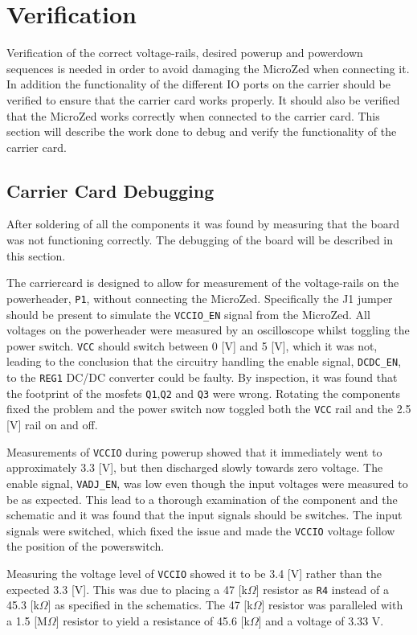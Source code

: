 \section{Verification}
Verification of the correct voltage-rails, desired powerup and powerdown sequences is needed in order to avoid damaging the MicroZed when connecting it.
In addition the functionality of the different IO ports on the carrier should be verified to ensure that the carrier card works properly.
It should also be verified that the MicroZed works correctly when connected to the carrier card.
This section will describe the work done to debug and verify the functionality of the carrier card.

\subsection{Carrier Card Debugging}
After soldering of all the components it was found by measuring that the board was not functioning correctly.
The debugging of the board will be described in this section.

The carriercard is designed to allow for measurement of the voltage-rails on the powerheader, \texttt{P1}, without connecting the MicroZed.
Specifically the J1 jumper should be present to simulate the \texttt{VCCIO\_EN} signal from the MicroZed.
All voltages on the powerheader were measured by an oscilloscope whilst toggling the power switch.
\texttt{VCC} should switch between 0 [V] and 5 [V], which it was not, leading to the conclusion that the circuitry handling the enable signal, \texttt{DCDC\_EN}, to the \texttt{REG1} DC/DC converter could be faulty.
By inspection, it was found that the footprint of the mosfets \texttt{Q1},\texttt{Q2} and \texttt{Q3} were wrong.
Rotating the components fixed the problem and the power switch now toggled both the \texttt{VCC} rail and the 2.5 [V] rail on and off.

Measurements of \texttt{VCCIO} during powerup showed that it immediately went to approximately 3.3 [V], but then discharged slowly towards zero voltage.
The enable signal, \texttt{VADJ\_EN}, was low even though the input voltages were measured to be as expected.
This lead to a thorough examination of the component and the schematic and it was found that the input signals should be switches.
The input signals were switched, which fixed the issue and made the \texttt{VCCIO} voltage follow the position of the powerswitch.

Measuring the voltage level of \texttt{VCCIO} showed it to be 3.4 [V] rather than the expected 3.3 [V].
This was due to placing a 47 [k$\Omega$] resistor as \texttt{R4} instead of a 45.3 [k$\Omega$] as specified in the schematics.
The 47 [k$\Omega$] resistor was paralleled with a 1.5 [M$\Omega$] resistor to yield a resistance of 45.6 [k$\Omega$] and a voltage of 3.33 V.

